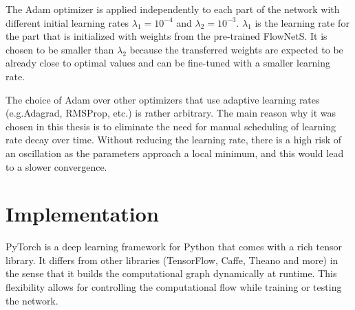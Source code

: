 		The Adam optimizer is applied independently to each part of the network with different initial learning rates
		$\lambda_1 = 10^{-4}$ and $\lambda_2 = 10^{-3}$.
		$\lambda_1$ is the learning rate for the part that is initialized with weights from the pre-trained FlowNetS.
		It is chosen to be smaller than $\lambda_2$ because the transferred weights are expected to be already close to optimal values and can be fine-tuned with a smaller learning rate.
		
		The choice of Adam over other optimizers that use adaptive learning rates (e.g.\@ Adagrad, RMSProp, etc.) is rather arbitrary.
		The main reason why it was chosen in this thesis is to eliminate the need for manual scheduling of learning rate decay over time.
		Without reducing the learning rate, there is a high risk of an oscillation as the parameters approach a local minimum, and this would lead to a slower convergence.

	\section{Implementation}
		PyTorch is a deep learning framework for Python that comes with a rich tensor library.
		It differs from other libraries (TensorFlow, Caffe, Theano and more) in the sense that it builds the computational graph dynamically at runtime.
		This flexibility allows for controlling the computational flow while training or testing the network.
		
		


